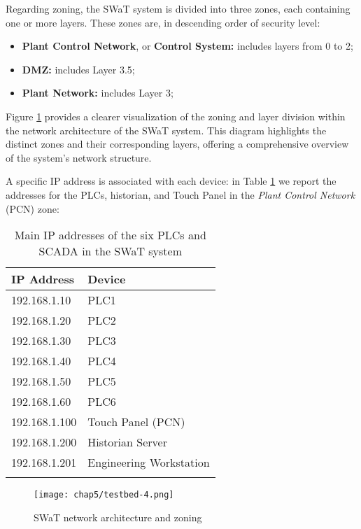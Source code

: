 \bigskip
Regarding zoning, the SWaT system is divided into three zones, each containing one or more layers. These zones are, in descending order of security level: 

\begin{itemize}
	\item \textbf{Plant Control Network}, or \textbf{Control System:} includes layers from 0 to 2;
	\item \textbf{DMZ:} includes Layer 3.5;
	\item \textbf{Plant Network:} includes Layer 3;
\end{itemize}

Figure \ref{fig:5_swat_network_arch} \cite{swat_home} provides a clearer visualization of the zoning and layer division within the network architecture of the SWaT system. This diagram highlights the distinct zones and their corresponding layers, offering a comprehensive overview of the system's network structure.

\bigskip
A specific IP address is associated with each device: in Table \ref{table:5_swat_ip_addresses} we report the addresses for the PLCs, historian, and Touch Panel in the \textit{Plant Control Network} (PCN) zone:

\bigskip
{\small
\begin{longtable}[c]{p{} p{}}
	\hline
	\textbf{IP Address} & \textbf{Device} \\ [0.5ex] 
	\hline
	192.168.1.10 & PLC1 \\
	\hline 
	192.168.1.20 & PLC2 \\
	\hline
	192.168.1.30 & PLC3 \\
	\hline
	192.168.1.40 & PLC4 \\
	\hline
	192.168.1.50 & PLC5 \\
	\hline
	192.168.1.60 & PLC6 \\
	\hline
	192.168.1.100 & {Touch Panel (PCN)} \\
	\hline
	192.168.1.200 & Historian Server \\
	\hline
	192.168.1.201 & Engineering Workstation \\
	\hline
	
	\caption{Main IP addresses of the six PLCs and SCADA in the SWaT system}
	\label{table:5_swat_ip_addresses}
\end{longtable}
}

\begin{figure}[ht]
	\centering
	\texttt{[image: chap5/testbed-4.png]}
	\caption{SWaT network architecture and zoning}
	\label{fig:5_swat_network_arch}
\end{figure}

